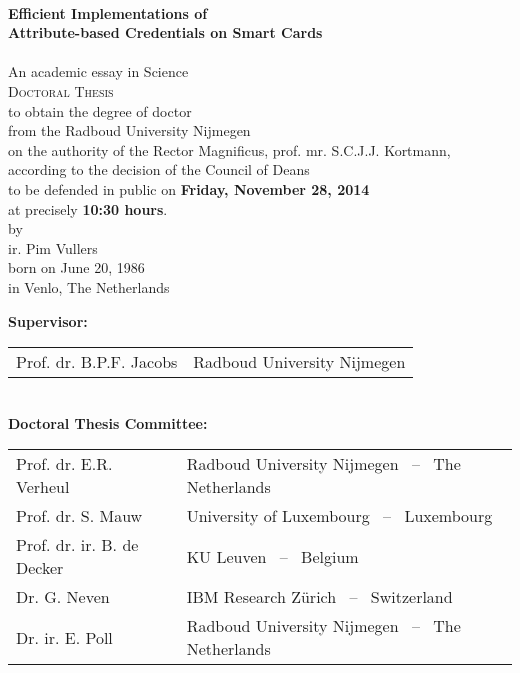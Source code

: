\thispagestyle{empty}

\begin{center}
  ~ \\[20mm]

  \textbf{\Large Efficient Implementations of\\ Attribute-based Credentials on Smart Cards}\\[15mm]

  ~ \\
  An academic essay in Science \\[15mm]

  \textsc{Doctoral Thesis} \\[15mm]

  to obtain the degree of doctor \\
  from the Radboud University Nijmegen \\
  on the authority of the Rector Magnificus, prof. mr. S.C.J.J. Kortmann, \\
  according to the decision of the Council of Deans \\
  to be defended in public on \textbf{Friday, November 28, 2014} \\
  at precisely \textbf{10:30 hours}. \\[20mm]

  by \\[20mm]

  ir. Pim Vullers \\[15mm]

  born on June 20, 1986 \\
  in Venlo, The Netherlands
\end{center}

\clearpage

\thispagestyle{empty}

\noindent\textbf{Supervisor:} \\[2mm]
\indent\begin{tabular}{ll}
  Prof. dr. B.P.F. Jacobs & Radboud University Nijmegen \\
\end{tabular} \\[2mm]

\noindent\textbf{Doctoral Thesis Committee:} \\[2mm]
\indent\begin{tabular}{ll}
  Prof. dr. E.R. Verheul     & Radboud University Nijmegen ~--~ The Netherlands \\
  Prof. dr. S. Mauw          & University of Luxembourg ~--~ Luxembourg \\
  Prof. dr. ir. B. de Decker & KU Leuven ~--~ Belgium \\
  Dr. G. Neven               & IBM Research Z\"{u}rich ~--~ Switzerland \\
  Dr. ir. E. Poll            & Radboud University Nijmegen ~--~ The Netherlands \\
\end{tabular}
